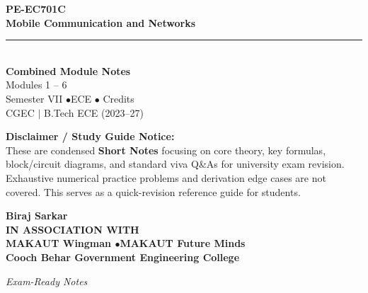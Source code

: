 \documentclass[12pt,a4paper]{article}
\begin{document}
\thispagestyle{empty}


\vspace*{1.0cm}
\begin{center}
  {\Huge\bfseries\color{myred} PE-EC701C}\\[10pt]
  {\LARGE\bfseries\color{mydark} Mobile Communication and Networks}\\[20pt]
  {\color{myred}\rule{0.7\linewidth}{1.5pt}}\\[18pt]
  {\Large\color{myteal}\textbf{Combined Module Notes}}\\[8pt]
  {\large\color{mydark} Modules 1 -- 6}\\[40pt]
  {\normalsize\color{mydark} Semester VII \quad$\bullet$\quad ECE \quad$\bullet$ Credits}\\[12pt]
  {\normalsize\color{mydark} CGEC \;$|$\; B.Tech ECE (2023--27)}
\end{center}
\vspace{1.0cm}
\begin{center}
  \begin{tcolorbox}[colback=mygray, colframe=mgframe, boxrule=0.5pt, arc=3pt, width=0.85\linewidth]
    \centering\small\color{mydark}
    \textbf{Disclaimer / Study Guide Notice:}\\
    These are condensed \textbf{Short Notes} focusing on core theory, key formulas, block/circuit diagrams, and standard viva Q\&As for university exam revision. Exhaustive numerical practice problems and derivation edge cases are not covered. This serves as a quick-revision reference guide for students.
  \end{tcolorbox}
\end{center}
\vfill
\vspace{0.6cm}
\begin{center}
  {\large\bfseries\color{mypurple} Biraj Sarkar}\\[16pt]
  {\footnotesize\color{watermark}\textbf{IN ASSOCIATION WITH}}\\[8pt]
  {\small\bfseries\color{mydark} MAKAUT Wingman \quad$\bullet$\quad MAKAUT Future Minds}\\[12pt]
  {\large\bfseries\color{myteal} Cooch Behar Government Engineering College}
\end{center}
\vfill
\begin{center}{\small\color{watermark}\textit{Exam-Ready Notes}}\end{center}
\clearpage
\end{document}

